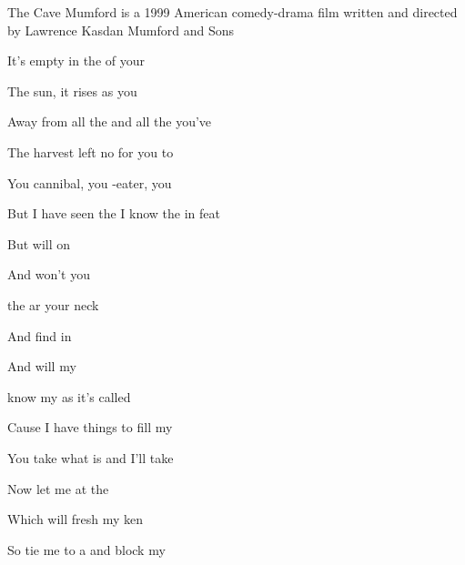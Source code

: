 \begin{SBSong}{The Cave}
  {Mumford is a 1999 American comedy-drama film written and directed by Lawrence Kasdan}
  {Mumford and Sons}
  \begin{SBVerse}
	It's empty in the  of your 
	
	The sun, it rises  as you 
	
	Away from all the  and all the  you've    
  \end{SBVerse}
  \begin{SBVerse}
	The harvest left no  for you to 
	
	You cannibal, you -eater, you 
	
	But I have seen the  I know the  in  feat  
  \end{SBVerse}
  \begin{SBVerse}
        But  will  on 
        
        And  won't  you 
        
         the  ar your neck
   
        And  find  in 
  
        And  will  my 
        
         know my  as it's called 
  \end{SBVerse}
  \begin{SBVerse}
        Cause I have  things to fill my 
        
        You take what is  and I'll take 
        
        Now let me at the 
        
        Which will fresh my ken   
  \end{SBVerse}
  \begin{SBVerse}
        So tie me to a  and block my 
        

\end{SBVerse}
\end{SBSong}
